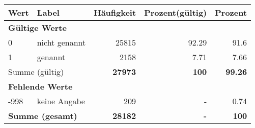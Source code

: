      \begin{longtable}{lXrrr}
     \toprule
     \textbf{Wert} & \textbf{Label} & \textbf{Häufigkeit} & \textbf{Prozent(gültig)} & \textbf{Prozent} \\
     \endhead
     \midrule
     \multicolumn{5}{l}{\textbf{Gültige Werte}}\\

     0 &
     \multicolumn{1}{X}{ nicht genannt   } &


       \num{25815} &
       \num[round-mode=places,round-precision=2]{92.29} &
         \num[round-mode=places,round-precision=2]{91.6} \\

     1 &
     \multicolumn{1}{X}{ genannt   } &


       \num{2158} &
       \num[round-mode=places,round-precision=2]{7.71} &
         \num[round-mode=places,round-precision=2]{7.66} \\
     \midrule
     \multicolumn{2}{l}{Summe (gültig)} &
       \textbf{\num{27973}} &
     \textbf{100} &
       \textbf{\num[round-mode=places,round-precision=2]{99.26}} \\
     \multicolumn{5}{l}{\textbf{Fehlende Werte}}\\
       -998 &
       keine Angabe &
         \num{209} &
        - &
         \num[round-mode=places,round-precision=2]{0.74} \\
     \midrule
     \multicolumn{2}{l}{\textbf{Summe (gesamt)}} &
          \textbf{\num{28182}} &
        \textbf{-} &
        \textbf{100} \\
     \bottomrule
     \end{longtable}
     
